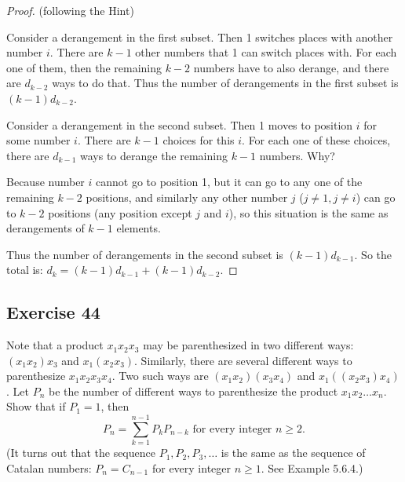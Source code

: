 \documentclass[14pt]{extarticle}
\begin{document}
\begin{proof}
     (following the Hint)

     Consider a derangement in the first subset. Then 1 switches places with another number $i$. There are $k-1$ other
     numbers that 1 can switch places with. For each one of them, then the remaining \(k-2\) numbers have to also
     derange, and there are \(d_{k-2}\) ways to do that. Thus the number of derangements in the first subset is
     \((k-1)d_{k-2}\).

     Consider a derangement in the second subset. Then 1 moves to position $i$ for some number $i$. There are $k-1$
     choices for this $i$. For each one of these choices, there are \(d_{k-1}\) ways to derange the remaining $k-1$
     numbers. Why?

     Because number $i$ cannot go to position 1, but it can go to any one of the remaining $k-2$ positions, and similarly
     any other number $j$ (\(j \neq 1, j \neq i\)) can go to $k-2$ positions (any position except $j$ and $i$), so this
     situation is the same as derangements of $k-1$ elements.

     Thus the number of derangements in the second subset is \((k-1)d_{k-1}\). So the total is:
     \(d_k = (k - 1)d_{k-1} + (k - 1)d_{k-2}\).
\end{proof}

\subsection{Exercise 44}
Note that a product \(x_1x_2x_3\) may be parenthesized in two different ways: \((x_1x_2)x_3\) and \(x_1(x_2x_3)\).
Similarly, there are several different ways to parenthesize \(x_1x_2x_3x_4\). Two such ways are \((x_1x_2)(x_3x_4)\)
and \(x_1((x_2 x_3)x_4)\). Let \(P_n\) be the number of different ways to parenthesize the product \(x_1x_2 \ldots
x_n\). Show that if \(P_1 = 1\), then
\[
     P_n = \sum_{k=1}^{n-1} P_k P_{n-k} \text{ for every integer  } n \geq 2.
\]
(It turns out that the sequence \(P_1, P_2, P_3, \ldots\) is the same as the sequence of Catalan numbers:
\(P_n = C_{n-1}\) for every integer \(n \geq 1\). See Example 5.6.4.)
\end{document}
